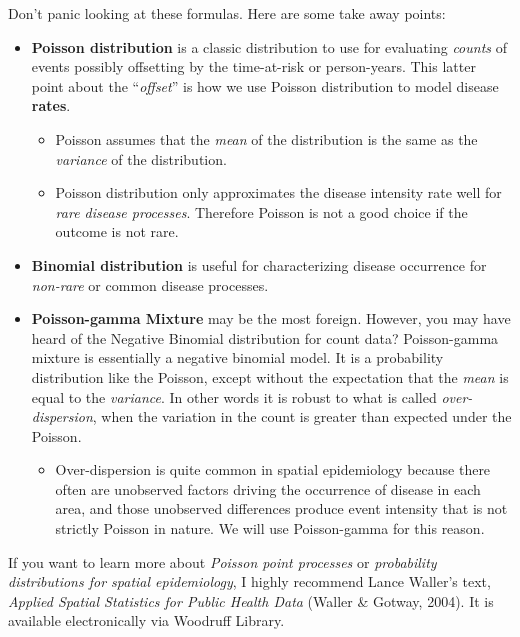 \documentclass[
]{book}
\providecommand{\tightlist}{%
  \setlength{\itemsep}{0pt}\setlength{\parskip}{0pt}}
\begin{document}
Don't panic looking at these formulas. Here are some take away points:

\begin{itemize}
\tightlist
\item
  \textbf{Poisson distribution} is a classic distribution to use for evaluating \emph{counts} of events possibly offsetting by the time-at-risk or person-years. This latter point about the ``\emph{offset}'' is how we use Poisson distribution to model disease \textbf{rates}.

  \begin{itemize}
  \tightlist
  \item
    Poisson assumes that the \emph{mean} of the distribution is the same as the \emph{variance} of the distribution.
  \item
    Poisson distribution only approximates the disease intensity rate well for \emph{rare disease processes}. Therefore Poisson is not a good choice if the outcome is not rare.
  \end{itemize}
\item
  \textbf{Binomial distribution} is useful for characterizing disease occurrence for \emph{non-rare} or common disease processes.
\item
  \textbf{Poisson-gamma Mixture} may be the most foreign. However, you may have heard of the Negative Binomial distribution for count data? Poisson-gamma mixture is essentially a negative binomial model. It is a probability distribution like the Poisson, except without the expectation that the \emph{mean} is equal to the \emph{variance}. In other words it is robust to what is called \emph{over-dispersion}, when the variation in the count is greater than expected under the Poisson.

  \begin{itemize}
  \tightlist
  \item
    Over-dispersion is quite common in spatial epidemiology because there often are unobserved factors driving the occurrence of disease in each area, and those unobserved differences produce event intensity that is not strictly Poisson in nature. We will use Poisson-gamma for this reason.
  \end{itemize}
\end{itemize}

If you want to learn more about \emph{Poisson point processes} or \emph{probability distributions for spatial epidemiology}, I highly recommend Lance Waller's text, \emph{Applied Spatial Statistics for Public Health Data} (Waller \& Gotway, 2004). It is available electronically via Woodruff Library.
\end{document}
